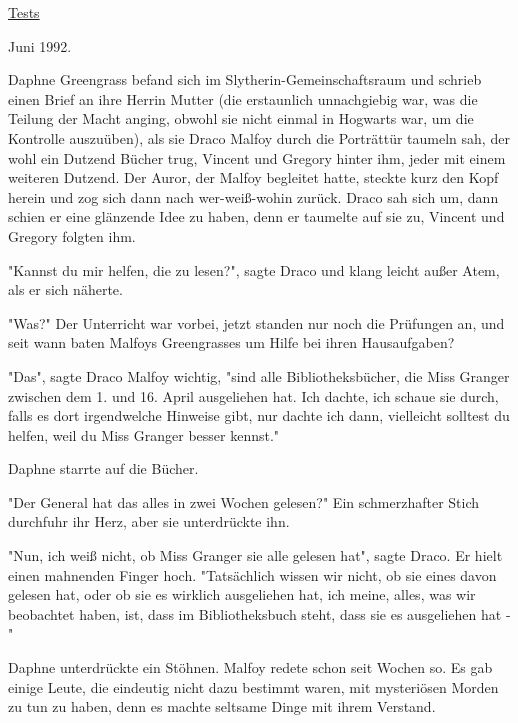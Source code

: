 

\hypertarget{tests}{%

\uline{Tests}

Juni 1992.

Daphne Greengrass befand sich im Slytherin-Gemeinschaftsraum und schrieb einen Brief an ihre Herrin Mutter (die erstaunlich unnachgiebig war, was die Teilung der Macht anging, obwohl sie nicht einmal in Hogwarts war, um die Kontrolle auszuüben), als sie Draco Malfoy durch die Porträttür taumeln sah, der wohl ein Dutzend Bücher trug, Vincent und Gregory hinter ihm, jeder mit einem weiteren Dutzend. Der Auror, der Malfoy begleitet hatte, steckte kurz den Kopf herein und zog sich dann nach wer-weiß-wohin zurück. Draco sah sich um, dann schien er eine glänzende Idee zu haben, denn er taumelte auf sie zu, Vincent und Gregory folgten ihm.

"Kannst du mir helfen, die zu lesen?", sagte Draco und klang leicht außer Atem, als er sich näherte.

"Was?" Der Unterricht war vorbei, jetzt standen nur noch die Prüfungen an, und seit wann baten Malfoys Greengrasses um Hilfe bei ihren Hausaufgaben?

"Das", sagte Draco Malfoy wichtig, "sind alle Bibliotheksbücher, die Miss Granger zwischen dem 1. und 16. April ausgeliehen hat. Ich dachte, ich schaue sie durch, falls es dort irgendwelche Hinweise gibt, nur dachte ich dann, vielleicht solltest du helfen, weil du Miss Granger besser kennst."

Daphne starrte auf die Bücher.

"Der General hat das alles in zwei Wochen gelesen?" Ein schmerzhafter Stich durchfuhr ihr Herz, aber sie unterdrückte ihn.

"Nun, ich weiß nicht, ob Miss Granger sie alle gelesen hat", sagte Draco. Er hielt einen mahnenden Finger hoch. "Tatsächlich wissen wir nicht, ob sie eines davon gelesen hat, oder ob sie es wirklich ausgeliehen hat, ich meine, alles, was wir beobachtet haben, ist, dass im Bibliotheksbuch steht, dass sie es ausgeliehen hat -"

Daphne unterdrückte ein Stöhnen. Malfoy redete schon seit Wochen so. Es gab einige Leute, die eindeutig nicht dazu bestimmt waren, mit mysteriösen Morden zu tun zu haben, denn es machte seltsame Dinge mit ihrem Verstand.

}
